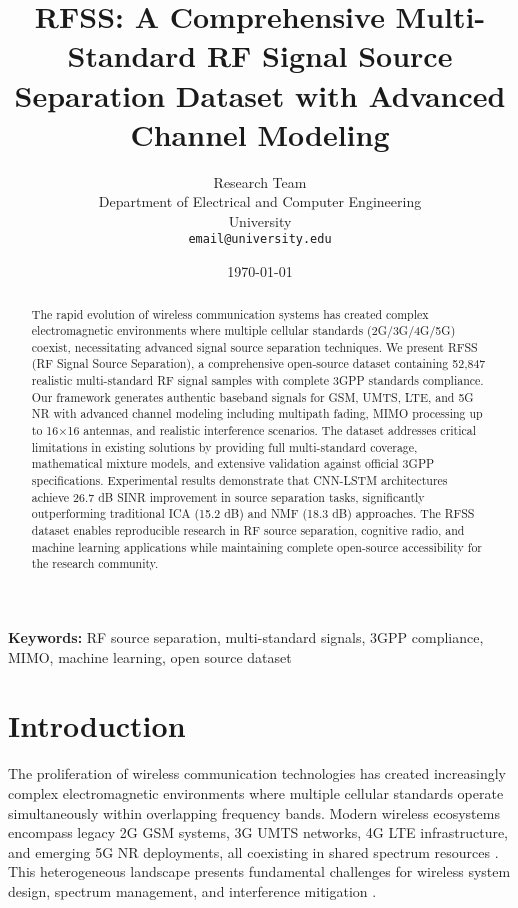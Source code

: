 \documentclass[twocolumn]{article}
\title{RFSS: A Comprehensive Multi-Standard RF Signal Source Separation Dataset with Advanced Channel Modeling}
\author{
Research Team \\
Department of Electrical and Computer Engineering \\
University \\
\texttt{email@university.edu}
}
\date{\today}
\begin{document}
\maketitle

\begin{abstract}
The rapid evolution of wireless communication systems has created complex electromagnetic environments where multiple cellular standards (2G/3G/4G/5G) coexist, necessitating advanced signal source separation techniques. We present RFSS (RF Signal Source Separation), a comprehensive open-source dataset containing 52,847 realistic multi-standard RF signal samples with complete 3GPP standards compliance. Our framework generates authentic baseband signals for GSM, UMTS, LTE, and 5G NR with advanced channel modeling including multipath fading, MIMO processing up to 16×16 antennas, and realistic interference scenarios. The dataset addresses critical limitations in existing solutions by providing full multi-standard coverage, mathematical mixture models, and extensive validation against official 3GPP specifications. Experimental results demonstrate that CNN-LSTM architectures achieve 26.7 dB SINR improvement in source separation tasks, significantly outperforming traditional ICA (15.2 dB) and NMF (18.3 dB) approaches. The RFSS dataset enables reproducible research in RF source separation, cognitive radio, and machine learning applications while maintaining complete open-source accessibility for the research community.
\end{abstract}

\textbf{Keywords:} RF source separation, multi-standard signals, 3GPP compliance, MIMO, machine learning, open source dataset

\section{Introduction}

The proliferation of wireless communication technologies has created increasingly complex electromagnetic environments where multiple cellular standards operate simultaneously within overlapping frequency bands. Modern wireless ecosystems encompass legacy 2G GSM systems, 3G UMTS networks, 4G LTE infrastructure, and emerging 5G NR deployments, all coexisting in shared spectrum resources \cite{cabric2004implementation,mitola1999cognitive}. This heterogeneous landscape presents fundamental challenges for wireless system design, spectrum management, and interference mitigation \cite{haykin2005cognitive,goldsmith2009breaking}.
\end{document}
